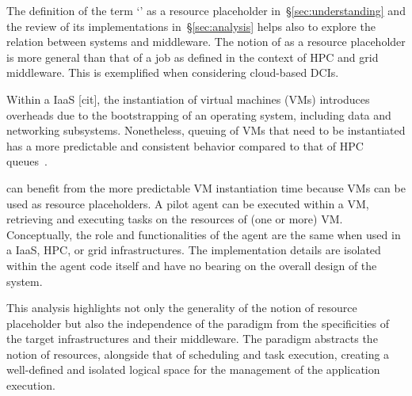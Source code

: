 \documentclass{sig-alternate}
\begin{document}


The definition of the term `\pilot' as a resource placeholder
in~\S\ref{sec:understanding} and the review of its implementations
in~\S\ref{sec:analysis} helps also to explore the relation between \pilot
systems and middleware. The notion of \pilot as a resource placeholder is more
general than that of a job as defined in the context of HPC and grid middleware.
This is exemplified when considering cloud-based DCIs.

Within a IaaS [cit], the instantiation of virtual machines (VMs) introduces
overheads due to the bootstrapping of an operating system, including data and
networking subsystems. Nonetheless, queuing of VMs that need to be instantiated
has a more predictable and consistent behavior compared to that of HPC
queues~\cite{Mao2012,gong2010}.

\pilots can benefit from the more predictable VM instantiation time because VMs
can be used as resource placeholders. A pilot agent can be executed within a
VM, retrieving and executing tasks on the resources of (one or more) VM.
Conceptually, the role and functionalities of the \pilot agent are the same
when used in a IaaS, HPC, or grid infrastructures. The implementation details
are isolated within the agent code itself and have no bearing on the overall
design of the \pilot system.

This analysis highlights not only the generality of the notion of resource
placeholder but also the independence of the \pilot paradigm from the
specificities of the target infrastructures and their middleware. The \pilot
paradigm abstracts the notion of resources, alongside that of scheduling and
task execution, creating a well-defined and isolated logical space for the
management of the application execution.
\end{document}
